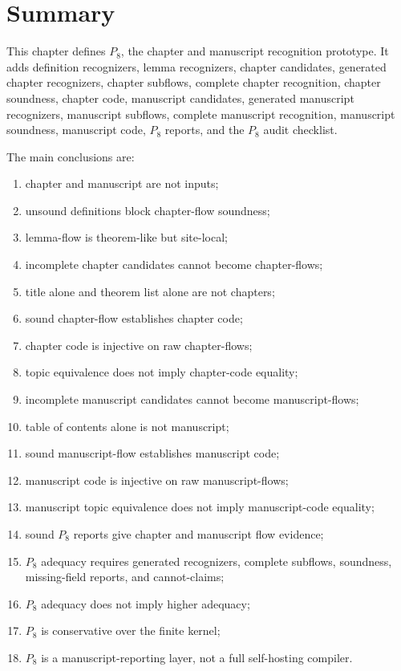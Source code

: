 \section{Summary}
\label{sec:chapter-manuscript-summary}

This chapter defines $P_8$, the chapter and manuscript recognition prototype. It adds definition recognizers, lemma recognizers, chapter candidates, generated chapter recognizers, chapter subflows, complete chapter recognition, chapter soundness, chapter code, manuscript candidates, generated manuscript recognizers, manuscript subflows, complete manuscript recognition, manuscript soundness, manuscript code, $P_8$ reports, and the $P_8$ audit checklist.

The main conclusions are:
\begin{enumerate}
\item chapter and manuscript are not inputs;
\item unsound definitions block chapter-flow soundness;
\item lemma-flow is theorem-like but site-local;
\item incomplete chapter candidates cannot become chapter-flows;
\item title alone and theorem list alone are not chapters;
\item sound chapter-flow establishes chapter code;
\item chapter code is injective on raw chapter-flows;
\item topic equivalence does not imply chapter-code equality;
\item incomplete manuscript candidates cannot become manuscript-flows;
\item table of contents alone is not manuscript;
\item sound manuscript-flow establishes manuscript code;
\item manuscript code is injective on raw manuscript-flows;
\item manuscript topic equivalence does not imply manuscript-code equality;
\item sound $P_8$ reports give chapter and manuscript flow evidence;
\item $P_8$ adequacy requires generated recognizers, complete subflows, soundness, missing-field reports, and cannot-claims;
\item $P_8$ adequacy does not imply higher adequacy;
\item $P_8$ is conservative over the finite kernel;
\item $P_8$ is a manuscript-reporting layer, not a full self-hosting compiler.
\end{enumerate}

